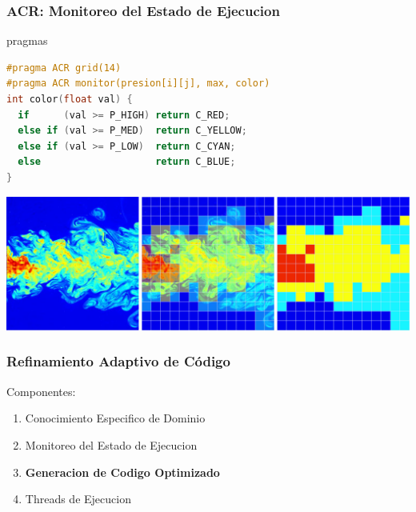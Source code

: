 \documentclass{beamer}\usetheme{Madrid} %
\begin{document}
\begin{frame}[fragile]
\frametitle{ACR: Monitoreo del Estado de Ejecucion}
\begin{block}{pragmas}
\begin{lstlisting}[basicstyle=\scriptsize,language=C]
#pragma ACR grid(14) 
#pragma ACR monitor(presion[i][j], max, color)
int color(float val) {
  if      (val >= P_HIGH) return C_RED; 
  else if (val >= P_MED)  return C_YELLOW;
  else if (val >= P_LOW)  return C_CYAN;
  else                    return C_BLUE;
}
\end{lstlisting}
\end{block}
\begin{center}
\includegraphics[scale=0.20]{img/turbulent_legal.png} \\
\end{center}
\end{frame}
\begin{frame}
\frametitle{Refinamiento Adaptivo de Código}
Componentes:
\begin{enumerate}
\item Conocimiento Especifico de Dominio
\item Monitoreo del Estado de Ejecucion
\item \textbf{Generacion de Codigo Optimizado}
\item Threads de Ejecucion
\end{enumerate}
\end{frame}
\end{document}
